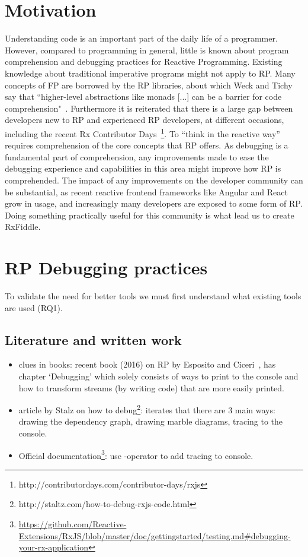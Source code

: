 \section{Motivation}
Understanding code is an important part of the daily life of a programmer. However, compared to programming in general, little is known about program comprehension and debugging practices for Reactive Programming. Existing knowledge about traditional imperative programs might not apply to RP. Many concepts of FP are borrowed by the RP libraries, about which Weck and Tichy say that ``higher-level abstractions like monads [...] can be a barrier for code comprehension"~\cite{weck2016visualizing}. Furthermore it is reiterated that there is a large gap between developers new to RP and experienced RP developers, at different occasions, including the recent Rx Contributor Days~\footnote{http://contributordays.com/contributor-days/rxjs}. To ``think in the reactive way'' requires comprehension of the core concepts that RP offers. As debugging is a fundamental part of comprehension, any improvements made to ease the debugging experience and capabilities in this area might improve how RP is comprehended.
The impact of any improvements on the developer community can be substantial, as recent reactive frontend frameworks like Angular and React grow in usage, and increasingly many developers are exposed to some form of RP. Doing something practically useful for this community is what lead us to create RxFiddle.

\section{RP Debugging practices}

To validate the need for better tools we must first understand what existing tools are used (RQ1).

\subsection{Literature and written work}
\begin{itemize}
	\item clues in books: recent book (2016) on RP by Esposito and Ciceri~\cite{esposito2016reactive}, has chapter `Debugging' which solely consists of ways to print to the console and how to transform streams (by writing code) that are more easily printed.
	\item article by Stalz on how to debug\footnote{http://staltz.com/how-to-debug-rxjs-code.html}: iterates that there are 3 main ways: drawing the dependency graph, drawing marble diagrams, tracing to the console.
	\item Official documentation\footnote{\url{https://github.com/Reactive-Extensions/RxJS/blob/master/doc/gettingstarted/testing.md\#debugging-your-rx-application}}: use -operator to add tracing to console.
\end{itemize}

